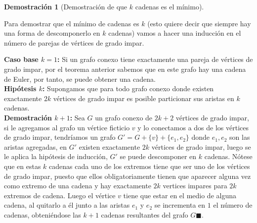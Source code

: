 \documentclass[a4paper,1pt]{report}
\newtheorem*{dem}{Demostración}
\begin{document}
\begin{dem}[Demostraci\'on de que $k$ cadenas es el m\'inimo]\end{dem}

Para demostrar que el m\'inimo de cadenas es $k$ (esto quiere decir que siempre hay una forma de descomponerlo en $k$ cadenas) vamos a hacer una inducci\'on en el n\'umero de parejas de v\'ertices de grado impar.

\textbf{Caso base $k =1$:} Si un grafo conexo tiene exactamente una pareja de v\'ertices de grado impar, por el teorema anterior sabemos que en este grafo hay una cadena de Euler, por tanto, se puede obtener una cadena. \\

\textbf{Hip\'otesis $k$:} Supongamos que para todo grafo conexo donde existen exactamente $2k$ v\'ertices de grado impar es posible particionar sus aristas en $k$ cadenas.\\

\textbf{Demostración $k+1$:} Sea $G$ un grafo conexo de $2k + 2$ v\'ertices de grado impar, si le agregamos al grafo un v\'ertice ficticio $v$ y lo conectamos a dos de los v\'ertices de grado impar, tendr\'iamos un grafo $G' = G + \{v\} + \{e_1, e_2\} $ donde $e_1, e_2$ son las aristas agregadas, en $G'$ existen exactamente $2k$ v\'ertices de grado impar, luego se le aplica la hip\'otesis de inducci\'on, $G'$ se puede descomponer en $k$ cadenas. 
N\'otese que en estas $k$ cadenas cada uno de los extremos tiene que ser uno de los v\'ertices de grado impar, puesto que ellos obligatoriamente tienen que aparecer alguna vez como extremo de una cadena y hay exactamente $2k$ vertices impares para $2k$ extremos de cadena. Luego el v\'ertice $v$ tiene que estar en el medio de alguna cadena, al quitarlo a \'el junto a las aristas $e_1$ y $e_2$ se incrementa en $1$ el n\'umero de cadenas, obteni\'endose las $k+1$ cadenas resultantes del grafo $G \blacksquare$. 
\end{document}
